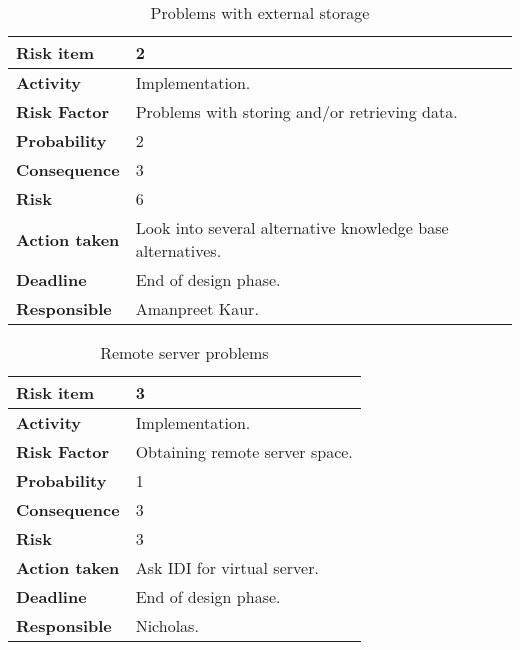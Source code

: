 \begin{table}[h!]

\begin{center}
\begin{tabularx}{\textwidth}{| X | X |}
\hline
\textbf{Risk item} & 2 \\
\hline
\textbf{Activity} & Implementation. \\
\hline
\textbf{Risk Factor} & Problems with storing and/or retrieving data. \\
\hline
\textbf{Probability} & 2 \\
\hline
\textbf{Consequence} & 3 \\
\hline
\textbf{Risk} & 6 \\
\hline
\textbf{Action taken} & Look into several alternative knowledge base alternatives.  \\
\hline
\textbf{Deadline} & End of design phase. \\
\hline
\textbf{Responsible} & Amanpreet Kaur. \\
\hline
\end{tabularx}
\caption{Problems with external storage}
\end{center}
\label{risk_4}
\end{table}

\begin{table}[h!]

\begin{center}
\begin{tabularx}{\textwidth}{| X | X |}
\hline
\textbf{Risk item} & 3 \\
\hline
\textbf{Activity} & Implementation.  \\
\hline
\textbf{Risk Factor} & Obtaining remote server space. \\
\hline
\textbf{Probability} & 1 \\
\hline
\textbf{Consequence} & 3 \\
\hline
\textbf{Risk} & 3 \\
\hline
\textbf{Action taken} & Ask IDI for virtual server. \\
\hline
\textbf{Deadline} & End of design phase. \\
\hline
\textbf{Responsible} & Nicholas. \\
\hline
\end{tabularx}
\caption{Remote server problems}
\end{center}
\label{risk_5}
\end{table}



